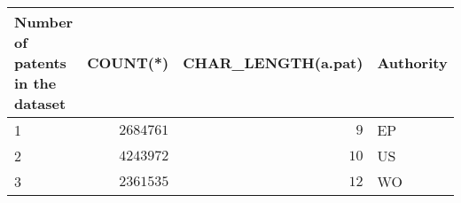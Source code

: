 \begin{table}[!tbp]
\begin{center}
\begin{tabular}{lrrl}
\hline\hline
\multicolumn{1}{l}{Number of patents in the dataset}&\multicolumn{1}{c}{COUNT(*)}&\multicolumn{1}{c}{CHAR_LENGTH(a.pat)}&\multicolumn{1}{c}{Authority}\tabularnewline
\hline
1&$2684761$&$ 9$&EP\tabularnewline
2&$4243972$&$10$&US\tabularnewline
3&$2361535$&$12$&WO\tabularnewline
\hline
\end{tabular}\end{center}
\end{table}

